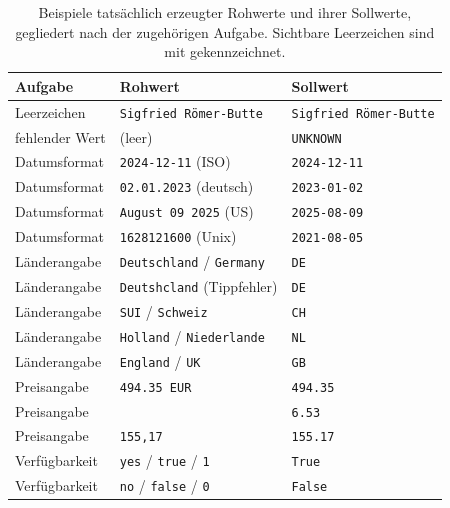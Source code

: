 \begin{table}[htbp]
    \centering
    \small
    \caption[Beispiele verfälschter Werte im Datensatz]{Beispiele tatsächlich erzeugter Rohwerte und ihrer Sollwerte, gegliedert nach der zugehörigen Aufgabe. Sichtbare Leerzeichen sind mit \textvisiblespace{} gekennzeichnet.}
    \label{tab:dirty-werte}
    \begin{tabularx}{\textwidth}{@{}l>{\raggedright\arraybackslash}X>{\raggedright\arraybackslash}X@{}}
        \toprule
        \textbf{Aufgabe} & \textbf{Rohwert} & \textbf{Sollwert} \\
        \midrule
        Leerzeichen &\texttt{\textvisiblespace\textvisiblespace Sigfried Römer-Butte\textvisiblespace\textvisiblespace} & \texttt{Sigfried Römer-Butte} \\
        fehlender Wert & \texttt{} (leer) & \texttt{UNKNOWN} \\
        \addlinespace
        Datumsformat & \texttt{2024-12-11} (ISO) & \texttt{2024-12-11} \\
        Datumsformat & \texttt{02.01.2023} (deutsch) & \texttt{2023-01-02} \\
        Datumsformat & \texttt{August 09 2025} (US) & \texttt{2025-08-09} \\
        Datumsformat & \texttt{1628121600} (Unix) & \texttt{2021-08-05} \\
        \addlinespace
        Länderangabe & \texttt{Deutschland} / \texttt{Germany} & \texttt{DE} \\
        Länderangabe & \texttt{Deutshcland} (Tippfehler) & \texttt{DE} \\
        Länderangabe & \texttt{SUI} / \texttt{Schweiz} & \texttt{CH} \\
        Länderangabe & \texttt{Holland} / \texttt{Niederlande} & \texttt{NL} \\
        Länderangabe & \texttt{England} / \texttt{UK} & \texttt{GB} \\
        \addlinespace
        Preisangabe & \texttt{494.35 EUR} & \texttt{494.35} \\
        Preisangabe & \texttt{\texteuro 6.53} & \texttt{6.53} \\
        Preisangabe & \texttt{155,17} & \texttt{155.17} \\
        Verfügbarkeit & \texttt{yes} / \texttt{true} / \texttt{1} & \texttt{True} \\
        Verfügbarkeit & \texttt{no} / \texttt{false} / \texttt{0} & \texttt{False} \\
        \bottomrule
    \end{tabularx}
\end{table}

